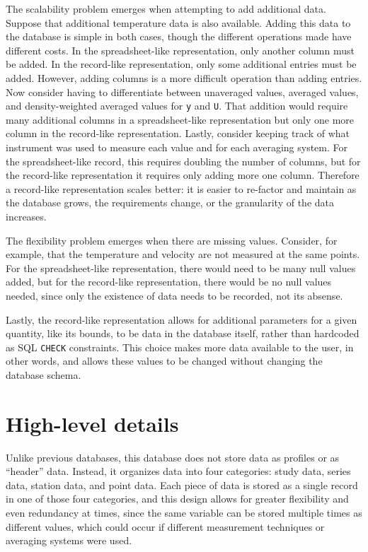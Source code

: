 The scalability problem emerges when attempting to add additional data.
Suppose that additional temperature data is also available.  Adding this data
to the database is simple in both cases, though the different operations made
have different costs.  In the spreadsheet-like representation, only another
column must be added.  In the record-like representation, only some additional
entries must be added.  However, adding columns is a more difficult operation
than adding entries.  Now consider having to differentiate between unaveraged
values, averaged values, and density-weighted averaged values for \texttt{y}
and \texttt{U}.  That addition would require many additional columns in a
spreadsheet-like representation but only one more column in the record-like
representation.  Lastly, consider keeping track of what instrument was used to
measure each value and for each averaging system.  For the spreadsheet-like
record, this requires doubling the number of columns, but for the record-like
representation it requires only adding more one column.  Therefore a
record-like representation scales better: it is easier to re-factor and
maintain as the database grows, the requirements change, or the granularity of
the data increases.

The flexibility problem emerges when there are missing values.  Consider, for
example, that the temperature and velocity are not measured at the same points.
For the spreadsheet-like representation, there would need to be many null
values added, but for the record-like representation, there would be no null
values needed, since only the existence of data needs to be recorded, not its
absense.

Lastly, the record-like representation allows for additional parameters for a
given quantity, like its bounds, to be data in the database itself, rather than
hardcoded as SQL \texttt{CHECK} constraints.  This choice makes more data
available to the user, in other words, and allows these values to be changed
without changing the database schema.


\section{High-level details}

Unlike previous databases, this database does not store data as profiles or as
``header'' data.  Instead, it organizes data into four categories: study data,
series data, station data, and point data.  Each piece of data is stored as a
single record in one of those four categories, and this design allows for
greater flexibility and even redundancy at times, since the same variable can
be stored multiple times as different values, which could occur if different
measurement techniques or averaging systems were used.

